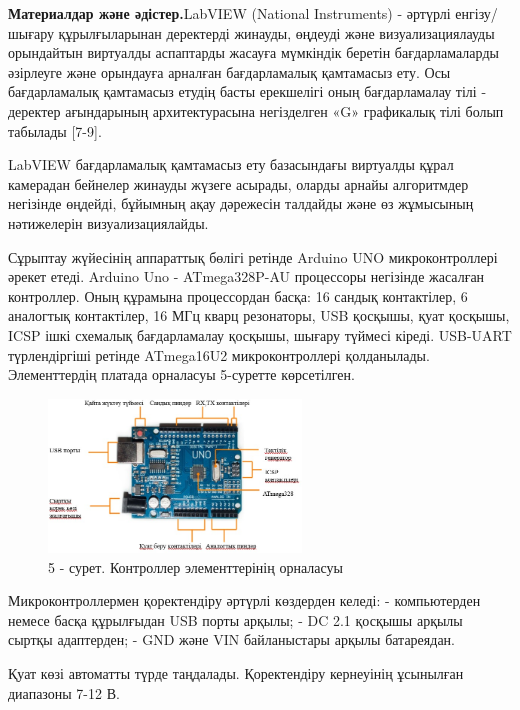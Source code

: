 \begin{multicols}{2}
{\bfseries Материалдар және әдістер.}LabVIEW (National Instruments) -
әртүрлі енгізу/шығару құрылғыларынан деректерді жинауды, өңдеуді және
визуализациялауды орындайтын виртуалды аспаптарды жасауға мүмкіндік
беретін бағдарламаларды әзірлеуге және орындауға арналған бағдарламалық
қамтамасыз ету. Осы бағдарламалық қамтамасыз етудің басты ерекшелігі
оның бағдарламалау тілі - деректер ағындарының архитектурасына
негізделген «G» графикалық тілі болып табылады {[}7-9{]}.

LabVIEW бағдарламалық қамтамасыз ету базасындағы виртуалды құрал
камерадан бейнелер жинауды жүзеге асырады, оларды арнайы алгоритмдер
негізінде өңдейді, бұйымның ақау дәрежесін талдайды және өз жұмысының
нәтижелерін визуализациялайды.

Сұрыптау жүйесінің аппараттық бөлігі ретінде Arduino UNO
микроконтроллері әрекет етеді. Arduino Uno - ATmega328P-AU процессоры
негізінде жасалған контроллер. Оның құрамына процессордан басқа: 16
сандық контактілер, 6 аналогтық контактілер, 16 МГц кварц резонаторы,
USB қосқышы, қуат қосқышы, ICSP ішкі схемалық бағдарламалау қосқышы,
шығару түймесі кіреді. USB-UART түрлендіргіші ретінде ATmega16U2
микроконтроллері қолданылады. Элементтердің платада орналасуы 5-суретте
көрсетілген.
\end{multicols}

\begin{figure}[H]
	\centering
	\includegraphics[width=0.6\textwidth]{media/ict2/image173}
	\caption*{5 - сурет. Контроллер элементтерінің орналасуы}
\end{figure}

\begin{multicols}{2}
Микроконтроллермен қоректендіру әртүрлі көздерден келеді: - компьютерден
немесе басқа құрылғыдан USB порты арқылы; - DC 2.1 қосқышы арқылы сыртқы
адаптерден; - GND және VIN байланыстары арқылы батареядан.

Қуат көзі автоматты түрде таңдалады. Қоректендіру кернеуінің ұсынылған
диапазоны 7-12 В.
\end{multicols}

